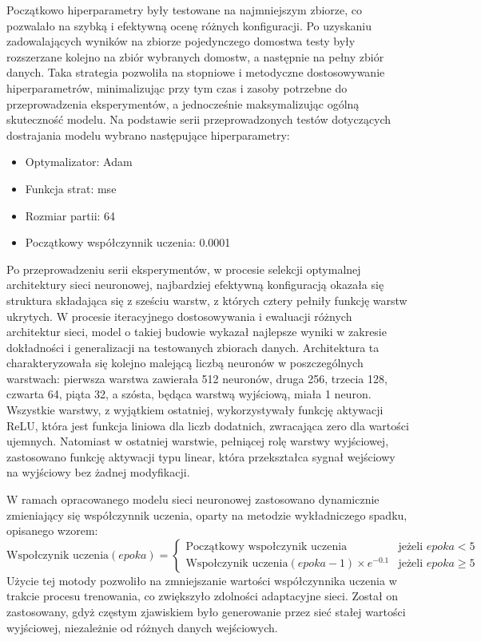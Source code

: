 \documentclass[a4paper,twoside,12pt]{book}
\begin{document}
Początkowo hiperparametry były testowane na najmniejszym zbiorze, co pozwalało na szybką i efektywną ocenę różnych konfiguracji. Po uzyskaniu zadowalających wyników na zbiorze pojedynczego domostwa testy były rozszerzane kolejno na zbiór wybranych domostw, a następnie na pełny zbiór danych. Taka strategia pozwoliła na stopniowe i metodyczne dostosowywanie hiperparametrów, minimalizując przy tym czas i zasoby potrzebne do przeprowadzenia eksperymentów, a jednocześnie maksymalizując ogólną skuteczność modelu. Na podstawie serii przeprowadzonych testów dotyczących dostrajania modelu wybrano następujące hiperparametry:
\newpage
\begin{itemize}
  \item Optymalizator: Adam
  \item Funkcja strat: mse
  \item Rozmiar partii: 64
  \item Początkowy współczynnik uczenia: 0.0001
\end{itemize}


Po przeprowadzeniu serii eksperymentów, w procesie selekcji optymalnej architektury sieci neuronowej, najbardziej efektywną konfiguracją okazała się struktura składająca się z sześciu warstw, z których cztery pełniły funkcję warstw ukrytych. W procesie iteracyjnego dostosowywania i ewaluacji różnych architektur sieci, model o takiej budowie wykazał najlepsze wyniki w zakresie dokładności i generalizacji na testowanych zbiorach danych. Architektura ta charakteryzowała się kolejno malejącą liczbą neuronów w poszczególnych warstwach: pierwsza warstwa zawierała 512 neuronów, druga 256, trzecia 128, czwarta 64, piąta 32, a szósta, będąca warstwą wyjściową, miała 1 neuron. Wszystkie warstwy, z wyjątkiem ostatniej, wykorzystywały funkcję aktywacji ReLU, która jest funkcja liniowa dla liczb dodatnich, zwracająca zero dla wartości ujemnych. Natomiast w ostatniej warstwie, pełniącej rolę warstwy wyjściowej, zastosowano funkcję aktywacji typu linear, która przekształca sygnał wejściowy na wyjściowy bez żadnej modyfikacji.


W ramach opracowanego modelu sieci neuronowej zastosowano dynamicznie zmieniający się współczynnik uczenia, oparty na metodzie wykładniczego spadku, opisanego wzorem:
\begin{equation}
  \text{Wspołczynik uczenia}(epoka) =
  \begin{cases}
    \text{Początkowy wspołczynik uczenia}                 & \text{jeżeli } epoka < 5    \\
    \text{Wspołczynik uczenia}(epoka - 1) \times e^{-0.1} & \text{jeżeli } epoka \geq 5
  \end{cases}
\end{equation}
Użycie tej motody pozwoliło na zmniejszanie wartości współczynnika uczenia w trakcie procesu trenowania, co zwiększyło zdolności adaptacyjne sieci. Został on zastosowany, gdyż częstym zjawiskiem było generowanie przez sieć stałej wartości wyjściowej, niezależnie od różnych danych wejściowych.\\
\end{document}
